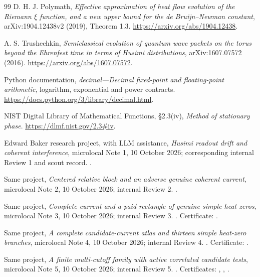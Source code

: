 \documentclass[11pt]{article}
\numberwithin{equation}{section}
\theoremstyle{definition}
\theoremstyle{remark}
\begin{document}
\begin{thebibliography}{99}
D. H. J. Polymath,
\emph{Effective approximation of heat flow evolution of the Riemann
$\xi$ function, and a new upper bound for the de Bruijn--Newman constant},
arXiv:1904.12438v2 (2019), Theorem 1.3.
\url{https://arxiv.org/abs/1904.12438}.

A. S. Trushechkin,
\emph{Semiclassical evolution of quantum wave packets on the torus beyond
the Ehrenfest time in terms of Husimi distributions},
arXiv:1607.07572 (2016).
\url{https://arxiv.org/abs/1607.07572}.

Python documentation, \emph{decimal---Decimal fixed-point and
floating-point arithmetic}, logarithm, exponential and power contracts.
\url{https://docs.python.org/3/library/decimal.html}.

NIST Digital Library of Mathematical Functions, \S2.3(iv),
\emph{Method of stationary phase}.
\url{https://dlmf.nist.gov/2.3#iv}.

Edward Baker research project, with LLM assistance,
\emph{Husimi readout drift and coherent interference}, microlocal Note 1,
10 October 2026; corresponding internal Review 1 and scout record.
.

Same project, \emph{Centered relative block and an adverse genuine
coherent current}, microlocal Note 2, 10 October 2026; internal Review 2.
.

Same project, \emph{Complete current and a paid rectangle of genuine
simple heat zeros}, microlocal Note 3, 10 October 2026; internal Review 3.
.
Certificate: .

Same project, \emph{A complete candidate-current atlas and thirteen
simple heat-zero branches}, microlocal Note 4, 10 October 2026;
internal Review 4.
.
Certificate: .

Same project, \emph{A finite multi-cutoff family with active correlated
candidate tests}, microlocal Note 5, 10 October 2026; internal Review 5.
.
Certificates: ,
,
.


\end{thebibliography}
\end{document}
